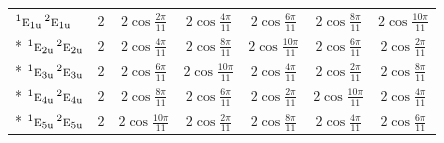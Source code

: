 \documentclass[10pt,a4paper]{article}
\numberwithin{equation}{section}
\newcommand{\irr}[1]{\text{\normalfont\scshape #1}}
\newcommand{\conjpair}[1]{{}^{#1}}
\newcommand{\ptag}[1]{\mathrm{#1}}
\begin{document}
{{\begin{longtable}{@{}lcccccc@{}}
$\conjpair{1}\irr{e}_{1\ptag{u}}\,\conjpair{2}\irr{e}_{1\ptag{u}}$ & $2$ & $2\cos\tfrac{2\pi}{11}$ & $2\cos\tfrac{4\pi}{11}$ & $2\cos\tfrac{6\pi}{11}$ & $2\cos\tfrac{8\pi}{11}$ & $2\cos\tfrac{10\pi}{11}$\\*
$\conjpair{1}\irr{e}_{2\ptag{u}}\,\conjpair{2}\irr{e}_{2\ptag{u}}$ & $2$ & $2\cos\tfrac{4\pi}{11}$ & $2\cos\tfrac{8\pi}{11}$ & $2\cos\tfrac{10\pi}{11}$ & $2\cos\tfrac{6\pi}{11}$ & $2\cos\tfrac{2\pi}{11}$\\*
$\conjpair{1}\irr{e}_{3\ptag{u}}\,\conjpair{2}\irr{e}_{3\ptag{u}}$ & $2$ & $2\cos\tfrac{6\pi}{11}$ & $2\cos\tfrac{10\pi}{11}$ & $2\cos\tfrac{4\pi}{11}$ & $2\cos\tfrac{2\pi}{11}$ & $2\cos\tfrac{8\pi}{11}$\\*
$\conjpair{1}\irr{e}_{4\ptag{u}}\,\conjpair{2}\irr{e}_{4\ptag{u}}$ & $2$ & $2\cos\tfrac{8\pi}{11}$ & $2\cos\tfrac{6\pi}{11}$ & $2\cos\tfrac{2\pi}{11}$ & $2\cos\tfrac{10\pi}{11}$ & $2\cos\tfrac{4\pi}{11}$\\*
$\conjpair{1}\irr{e}_{5\ptag{u}}\,\conjpair{2}\irr{e}_{5\ptag{u}}$ & $2$ & $2\cos\tfrac{10\pi}{11}$ & $2\cos\tfrac{2\pi}{11}$ & $2\cos\tfrac{8\pi}{11}$ & $2\cos\tfrac{4\pi}{11}$ & $2\cos\tfrac{6\pi}{11}$\\
\bottomrule\end{longtable}}}
\end{document}

